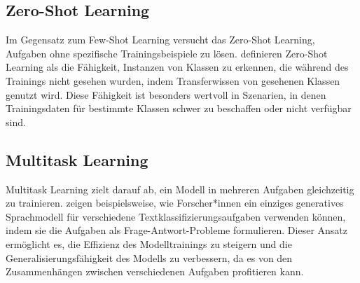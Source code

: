 \subsection{Zero-Shot Learning}
\label{subsec:zero-shot-learning}

Im Gegensatz zum Few-Shot Learning versucht das Zero-Shot Learning, Aufgaben ohne spezifische Trainingsbeispiele zu lösen. \textcite{XianYongqin2019ZLCE} definieren Zero-Shot Learning als die Fähigkeit, Instanzen von Klassen zu erkennen, die während des Trainings nicht gesehen wurden, indem Transferwissen von gesehenen Klassen genutzt wird. Diese Fähigkeit ist besonders wertvoll in Szenarien, in denen Trainingsdaten für bestimmte Klassen schwer zu beschaffen oder nicht verfügbar sind.

\subsection{Multitask Learning}
\label{subsec:multitask-learning}

Multitask Learning zielt darauf ab, ein Modell in mehreren Aufgaben gleichzeitig zu trainieren. \textcite{PuriRaul2019ZTCW} zeigen beispielsweise, wie Forscher*innen ein einziges generatives Sprachmodell für verschiedene Textklassifizierungsaufgaben verwenden können, indem sie die Aufgaben als Frage-Antwort-Probleme formulieren. Dieser Ansatz ermöglicht es, die Effizienz des Modelltrainings zu steigern und die Generalisierungsfähigkeit des Modells zu verbessern, da es von den Zusammenhängen zwischen verschiedenen Aufgaben profitieren kann.
